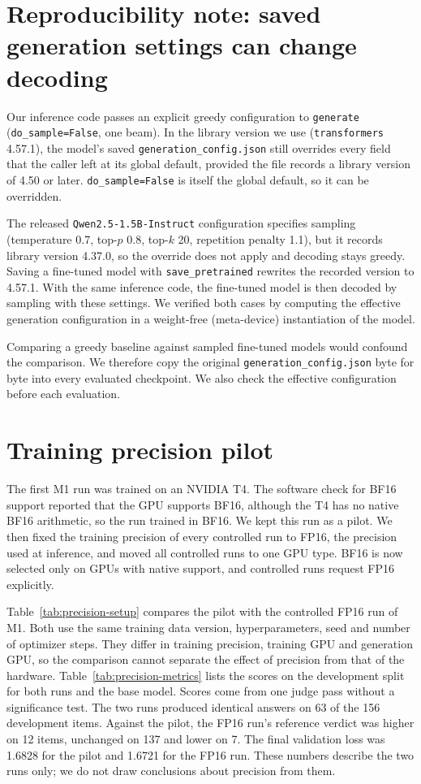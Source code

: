 \section{Reproducibility note: saved generation settings can change decoding}
\label{app:genconfig}

Our inference code passes an explicit greedy configuration to \texttt{generate} (\texttt{do\_sample=False}, one beam).
In the library version we use (\texttt{transformers} 4.57.1), the model's saved \texttt{generation\_config.json} still overrides every field that the caller left at its global default, provided the file records a library version of 4.50 or later.
\texttt{do\_sample=False} is itself the global default, so it can be overridden.

The released \texttt{Qwen2.5-1.5B-Instruct} configuration specifies sampling (temperature 0.7, top-$p$ 0.8, top-$k$ 20, repetition penalty 1.1), but it records library version 4.37.0, so the override does not apply and decoding stays greedy.
Saving a fine-tuned model with \texttt{save\_pretrained} rewrites the recorded version to 4.57.1.
With the same inference code, the fine-tuned model is then decoded by sampling with these settings.
We verified both cases by computing the effective generation configuration in a weight-free (meta-device) instantiation of the model.

Comparing a greedy baseline against sampled fine-tuned models would confound the comparison.
We therefore copy the original \texttt{generation\_config.json} byte for byte into every evaluated checkpoint.
We also check the effective configuration before each evaluation.

\section{Training precision pilot}
\label{app:precision}

The first M1 run was trained on an NVIDIA T4.
The software check for BF16 support reported that the GPU supports BF16, although the T4 has no native BF16 arithmetic, so the run trained in BF16.
We kept this run as a pilot.
We then fixed the training precision of every controlled run to FP16, the precision used at inference, and moved all controlled runs to one GPU type.
BF16 is now selected only on GPUs with native support, and controlled runs request FP16 explicitly.

Table~\ref{tab:precision-setup} compares the pilot with the controlled FP16 run of M1.
Both use the same training data version, hyperparameters, seed and number of optimizer steps.
They differ in training precision, training GPU and generation GPU, so the comparison cannot separate the effect of precision from that of the hardware.
Table~\ref{tab:precision-metrics} lists the scores on the development split for both runs and the base model.
Scores come from one judge pass without a significance test.
The two runs produced identical answers on 63 of the 156 development items.
Against the pilot, the FP16 run's reference verdict was higher on 12 items, unchanged on 137 and lower on 7.
The final validation loss was 1.6828 for the pilot and 1.6721 for the FP16 run.
These numbers describe the two runs only; we do not draw conclusions about precision from them.


